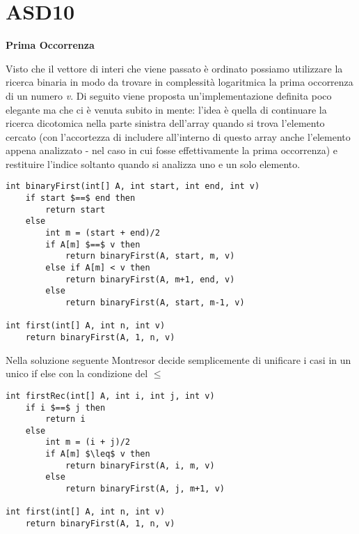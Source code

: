 \documentclass[../cheatSheetAlgoritmi.tex]{subfiles}
\begin{document}
\section{ASD10}
\textbf{Prima Occorrenza}

Visto che il vettore di interi che viene passato è ordinato possiamo utilizzare la ricerca binaria in modo da trovare in complessità logaritmica la prima occorrenza di un numero \textit{v}. Di seguito viene proposta un'implementazione definita poco elegante ma che ci è venuta subito in mente: l'idea è quella di continuare la ricerca dicotomica nella parte sinistra dell'array quando si trova l'elemento cercato (con l'accortezza di includere all'interno di questo array anche l'elemento appena analizzato - nel caso in cui fosse effettivamente la prima occorrenza) e restituire l'indice soltanto quando si analizza uno e un solo elemento.
\newpage
\begin{lstlisting}[caption=Prima Occorrenza]
int binaryFirst(int[] A, int start, int end, int v)
	if start $==$ end then
		return start
  	else
    	int m = (start + end)/2
    	if A[m] $==$ v then
      		return binaryFirst(A, start, m, v)
    	else if A[m] < v then
        	return binaryFirst(A, m+1, end, v)
      	else
        	return binaryFirst(A, start, m-1, v)

int first(int[] A, int n, int v)
	return binaryFirst(A, 1, n, v)
\end{lstlisting}
Nella soluzione seguente Montresor decide semplicemente di unificare i casi in un unico if else con la condizione del $\leq$
\begin{lstlisting}[caption=Prima Occorrenza (by Montresor)]
int firstRec(int[] A, int i, int j, int v)
	if i $==$ j then
    	return i
  	else
    	int m = (i + j)/2
    	if A[m] $\leq$ v then
      		return binaryFirst(A, i, m, v)
    	else
      		return binaryFirst(A, j, m+1, v)
      
int first(int[] A, int n, int v)
	return binaryFirst(A, 1, n, v)
\end{lstlisting}
\end{document}
